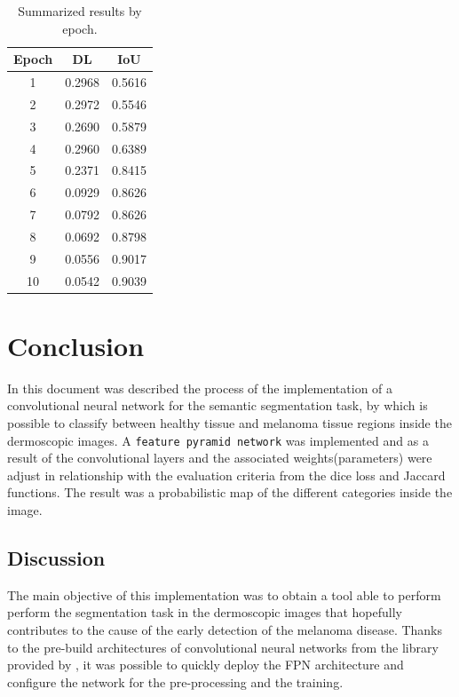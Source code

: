 \begin{table}[h]
  \centering
  \caption{Summarized results by epoch.}
  \begin{tabular}{c c c}
    \toprule
    \textbf{Epoch} & \textbf{DL} & \textbf{IoU} \\
    \midrule
    1 & 0.2968 & 0.5616 \\
    2 & 0.2972 & 0.5546 \\
    3 & 0.2690 & 0.5879 \\
    4 & 0.2960 & 0.6389 \\
    5 & 0.2371 & 0.8415 \\
    6 & 0.0929 & 0.8626 \\
    7 & 0.0792 & 0.8626 \\
    8 & 0.0692 & 0.8798 \\
    9 & 0.0556 & 0.9017 \\
    10 & 0.0542 & 0.9039 \\
    \bottomrule
    
  \end{tabular}
  \label{table:summary}
\end{table}

\section{Conclusion}
In this document was described the process of the implementation of a convolutional neural network for the semantic segmentation task, by which is possible to classify between healthy tissue and melanoma tissue regions inside the dermoscopic images. A \texttt{feature pyramid network} was implemented and as a result of the convolutional layers and the associated weights(parameters) were adjust in relationship with the evaluation criteria from the dice loss and Jaccard functions. The result was a probabilistic map of the different categories inside the image.

\subsection{Discussion}
The main objective of this implementation was to obtain a tool able to perform perform the segmentation task in the dermoscopic images that hopefully contributes to the cause of the early detection of the melanoma disease. Thanks to the pre-build architectures of convolutional neural networks from the library provided by \citet{Yakubovskiy:2019}, it was possible to quickly deploy the FPN architecture and configure the network for the pre-processing and the training.

